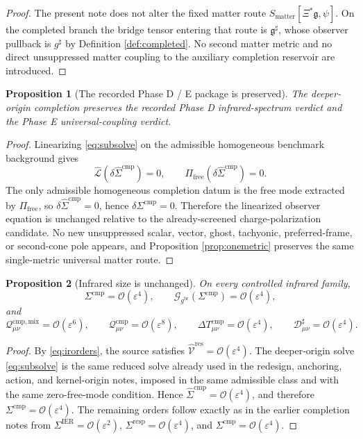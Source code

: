 \documentclass[11pt]{article}
\newcommand{\ObserverMap}{\Xi}
\newcommand{\BridgeMetric}{\mathfrak g}
\newcommand{\ObserverMetric}{g^{\mathrm{br}}}
\newcommand{\CompletedMetric}{g^{\sharp}}
\newcommand{\BaseShift}{\Sigma^{\mathrm{IER}}}
\newcommand{\ResponseShift}{\Sigma^{\mathrm{resp}}}
\newcommand{\CompShift}{\Sigma^{\mathrm{cmp}}}
\newcommand{\CompLift}{\widehat\Sigma^{\mathrm{cmp}}}
\newcommand{\ResidualLift}{\widehat{\mathcal V}^{\mathrm{res}}}
\newcommand{\SubReducedEin}{\widehat{\mathcal L}}
\newcommand{\FreeProj}{\Pi_{\mathrm{free}}}
\newcommand{\GaugeBook}{\mathcal G_{\ObserverMetric}}
\newcommand{\CompMix}{\mathcal Q_{\mu\nu}^{\mathrm{cmp,mix}}}
\newcommand{\CompQuad}{\mathcal Q_{\mu\nu}^{\mathrm{cmp}}}
\newcommand{\CompDec}{\mathcal D_{\mu\nu}^{\sharp}}
\newcommand{\DeltaTComp}{\Delta T_{\mu\nu}^{\mathrm{cmp}}}
\newcommand{\MatterAct}{S_{\mathrm{matter}}}
\newcommand{\epsIR}{\varepsilon}
\newtheorem{proposition}{Proposition}
\begin{document}
\begin{proof}
The present note does not alter the fixed matter route \(\MatterAct[\ObserverMap^*\BridgeMetric,\psi]\). On the completed branch the bridge tensor entering that route is \(\BridgeMetric^\sharp\), whose observer pullback is \(\CompletedMetric\) by Definition \ref{def:completed}. No second matter metric and no direct unsuppressed matter coupling to the auxiliary completion reservoir are introduced.
\end{proof}

\begin{proposition}[The recorded Phase D / E package is preserved]
\label{prop:phaseDE}
The deeper-origin completion preserves the recorded Phase D infrared-spectrum verdict and the Phase E universal-coupling verdict.
\end{proposition}

\begin{proof}
Linearizing \eqref{eq:subsolve} on the admissible homogeneous benchmark background gives
\[
\SubReducedEin(\delta\CompLift)=0,
\qquad
\FreeProj(\delta\CompLift)=0.
\]
The only admissible homogeneous completion datum is the free mode extracted by \(\FreeProj\), so \(\delta\CompLift=0\), hence \(\delta\CompShift=0\). Therefore the linearized observer equation is unchanged relative to the already-screened charge-polarization candidate. No new unsuppressed scalar, vector, ghost, tachyonic, preferred-frame, or second-cone pole appears, and Proposition \ref{prop:onemetric} preserves the same single-metric universal matter route.
\end{proof}

\begin{proposition}[Infrared size is unchanged]
\label{prop:size}
On every controlled infrared family,
\begin{equation}
\CompShift=\mathcal O(\epsIR^4),
\qquad
\GaugeBook(\CompShift)=\mathcal O(\epsIR^4),
\label{eq:ircomp}
\end{equation}
and
\begin{equation}
\CompMix=\mathcal O(\epsIR^6),
\qquad
\CompQuad=\mathcal O(\epsIR^8),
\qquad
\DeltaTComp=\mathcal O(\epsIR^4),
\qquad
\CompDec=\mathcal O(\epsIR^4).
\label{eq:irsizes}
\end{equation}
\end{proposition}

\begin{proof}
By \eqref{eq:irorders}, the source satisfies \(\ResidualLift=\mathcal O(\epsIR^4)\). The deeper-origin solve \eqref{eq:subsolve} is the same reduced solve already used in the redesign, anchoring, action, and kernel-origin notes, imposed in the same admissible class and with the same zero-free-mode condition. Hence \(\CompLift=\mathcal O(\epsIR^4)\), and therefore \(\CompShift=\mathcal O(\epsIR^4)\). The remaining orders follow exactly as in the earlier completion notes from \(\BaseShift=\mathcal O(\epsIR^2)\), \(\ResponseShift=\mathcal O(\epsIR^4)\), and \(\CompShift=\mathcal O(\epsIR^4)\).
\end{proof}
\end{document}
